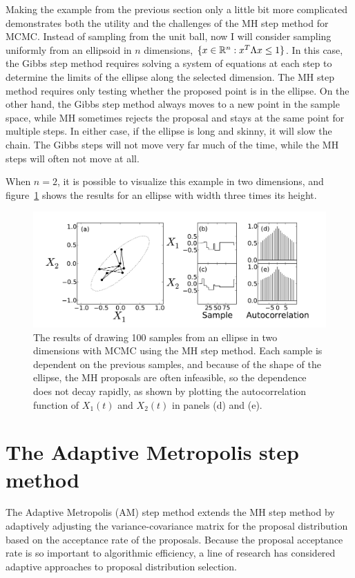 Making the example from the previous section only a little bit more
complicated demonstrates both the utility and the challenges of the MH
step method for MCMC.  Instead of sampling from the unit ball, now I
will consider sampling uniformly from an ellipsoid in $n$ dimensions,
$\{x\in \mathbb{R}^n : x^T \Lambda x \leq 1\}$.  In this case, the Gibbs
step method requires solving a system of equations at each step to
determine the limits of the ellipse along the selected dimension.  The
MH step method requires only testing whether the proposed point is in the
ellipse.  On the other hand, the Gibbs step method always moves to a
new point in the sample space, while MH sometimes rejects the proposal
and stays at the same point for multiple steps.  In either case, if
the ellipse is long and skinny, it will slow the chain.  The Gibbs
steps will not move very far much of the time, while the MH steps will
often not move at all.

When $n=2$, it is possible to visualize this example in two
dimensions, and figure~\ref{metropolis-ball} shows the results for an
ellipse with width three times its height.

\begin{figure}[ht]
\begin{center}
\includegraphics[width=\textwidth]{metropolis-ball.pdf}
\caption{The results of drawing 100 samples from an ellipse in two
  dimensions with MCMC using the MH step method.  Each sample is
  dependent on the previous samples, and because of the shape of the
  ellipse, the MH proposals are often infeasible, so the dependence
  does not decay rapidly, as shown by plotting the autocorrelation
  function of $X_1(t)$ and $X_2(t)$ in panels (d) and (e).}
\label{metropolis-ball}
\end{center}
\end{figure}


\section{The Adaptive Metropolis step method}
The Adaptive Metropolis (AM) step method extends the
MH step method by adaptively adjusting the
variance-covariance matrix for the proposal distribution based on the
acceptance rate of the
proposals.\cite{haario_adaptive_2001,patil_pymc:_2010} Because the
proposal acceptance rate is so important to algorithmic efficiency, a
line of research has considered adaptive approaches to proposal
distribution
selection.\cite{gelman_efficient_1996,gilks_adaptive_1994,
  gilks_adaptive_1998,sahu_self_1999}

